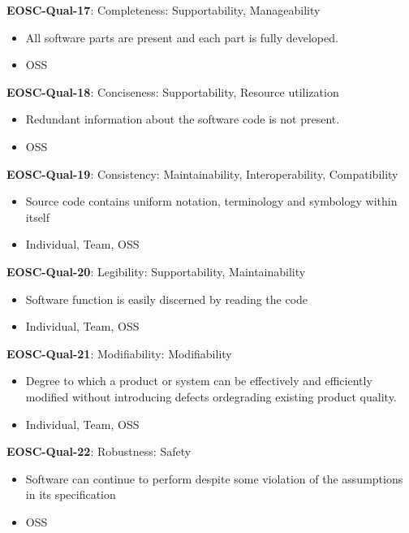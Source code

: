 \textbf{EOSC-Qual-17}: Completeness: Supportability, Manageability

\begin{itemize}
    \item All software parts are present and each part is fully developed. \cite{iso_25010_2011_2017,boehm_quantitative_1976}
    \item OSS
\end{itemize}

\textbf{EOSC-Qual-18}: Conciseness: Supportability, Resource utilization

\begin{itemize}
    \item Redundant information about the software code is not present. \cite{boehm_quantitative_1976}
    \item OSS
\end{itemize}

\textbf{EOSC-Qual-19}: Consistency: Maintainability, Interoperability, Compatibility

\begin{itemize}
    \item Source code contains uniform notation, terminology and symbology within itself \cite{boehm_quantitative_1976,raymond_software_2013}
    \item Individual, Team, OSS
\end{itemize}

\textbf{EOSC-Qual-20}: Legibility: Supportability, Maintainability

\begin{itemize}
    \item Software function is easily discerned by reading the code \cite{boehm_quantitative_1976}
    \item Individual, Team, OSS
\end{itemize}

\textbf{EOSC-Qual-21}: Modifiability: Modifiability

\begin{itemize}
    \item Degree to which a product or system can be effectively and efficiently modified without introducing defects ordegrading existing product quality. \cite{iso_25010_2011_2017,boehm_quantitative_1976}
    \item Individual, Team, OSS
\end{itemize}

\textbf{EOSC-Qual-22}: Robustness: Safety

\begin{itemize}
    \item Software can continue to perform despite some violation of the assumptions in its specification \cite{boehm_quantitative_1976}
    \item OSS
\end{itemize}

